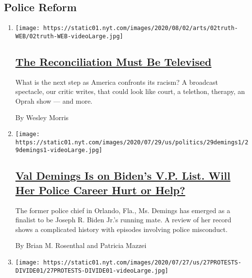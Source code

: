 \hypertarget{police-reform}{%
\subsection{Police Reform}\label{police-reform}}

\begin{enumerate}
\def\labelenumi{\arabic{enumi}.}
\item
  \texttt{[image: https://static01.nyt.com/images/2020/08/02/arts/02truth-WEB/02truth-WEB-videoLarge.jpg]}

  \hypertarget{the-reconciliation-must-be-televised}{%
  \subsection{\texorpdfstring{\href{/2020/07/30/arts/television/the-moment-racism-tv.html}{The
  Reconciliation Must Be
  Televised}}{The Reconciliation Must Be Televised}}\label{the-reconciliation-must-be-televised}}

  What is the next step as America confronts its racism? A broadcast
  spectacle, our critic writes, that could look like court, a telethon,
  therapy, an Oprah show --- and more.

  By Wesley Morris
\item
  \texttt{[image: https://static01.nyt.com/images/2020/07/29/us/politics/29demings1/29demings1-videoLarge.jpg]}

  \hypertarget{val-demings-is-on-bidens-vp-list-will-her-police-career-hurt-or-help}{%
  \subsection{\texorpdfstring{\href{/article/val-demings-biden-vp.html}{Val
  Demings Is on Biden's V.P. List. Will Her Police Career Hurt or
  Help?}}{Val Demings Is on Biden's V.P. List. Will Her Police Career Hurt or Help?}}\label{val-demings-is-on-bidens-vp-list-will-her-police-career-hurt-or-help}}

  The former police chief in Orlando, Fla., Ms. Demings has emerged as a
  finalist to be Joseph R. Biden Jr.'s running mate. A review of her
  record shows a complicated history with episodes involving police
  misconduct.

  By Brian M. Rosenthal and Patricia Mazzei
\item
  \texttt{[image: https://static01.nyt.com/images/2020/07/27/us/27PROTESTS-DIVIDE01/27PROTESTS-DIVIDE01-videoLarge.jpg]}

  \hypertarget{peaceful-protesters-with-room-for-rage-sympathize-with-aggressive-tactics}{%
}
\end{enumerate}
